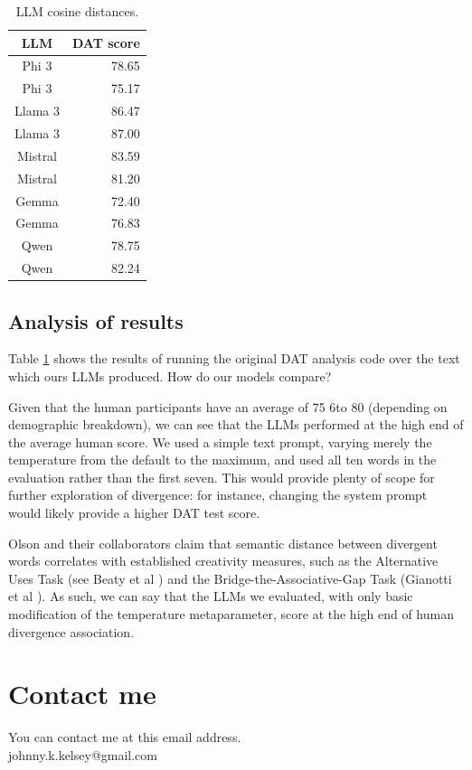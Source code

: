 \documentclass[9pt,a4paper,twoside]{rho-class/rho}
\begin{document}
\begin{table}
\caption{LLM cosine distances.}
\label{divergence_res2}
\begin{tabular}{cr}
\toprule
\textbf{LLM}  & \textbf{DAT score} \\ \hline 
Phi 3 & 78.65 \\
Phi 3 & 75.17 \\
Llama 3 & 86.47 \\
Llama 3 & 87.00 \\
Mistral & 83.59 \\
Mistral & 81.20 \\
Gemma & 72.40 \\
Gemma & 76.83 \\
Qwen & 78.75 \\
Qwen & 82.24 \\ \hline
\end{tabular}
\end{table}

\subsection{Analysis of results}

Table \ref{divergence_res2} shows the results of running the original DAT analysis code over the text which ours LLMs produced. How do our models compare?  

Given that the human participants have an average of 75 6to 80 (depending on demographic breakdown), we can see that the LLMs performed at the high end of the average human score. We used a simple text prompt, varying merely the temperature from the default to the maximum, and used all ten words in the evaluation rather than the first seven. This would provide plenty of scope for further exploration of divergence: for instance, changing the system prompt would likely provide a higher DAT test score.

Olson and their collaborators claim that semantic distance between divergent words correlates with established creativity measures, such as the Alternative Uses Task (see Beaty et al \cite{Beaty_2022}) and the Bridge-the-Associative-Gap Task (Gianotti et al \cite{Gianotti_2001}). As such, we can say that the LLMs we evaluated, with only basic modification of the temperature metaparameter, score at the high end of human divergence association. 

\section{Contact me}

    You can contact me at this email address.\\
    
    \faEnvelope[regular]\hspace{7pt}johnny.k.kelsey@gmail.com \\

\printbibliography

\end{document}
